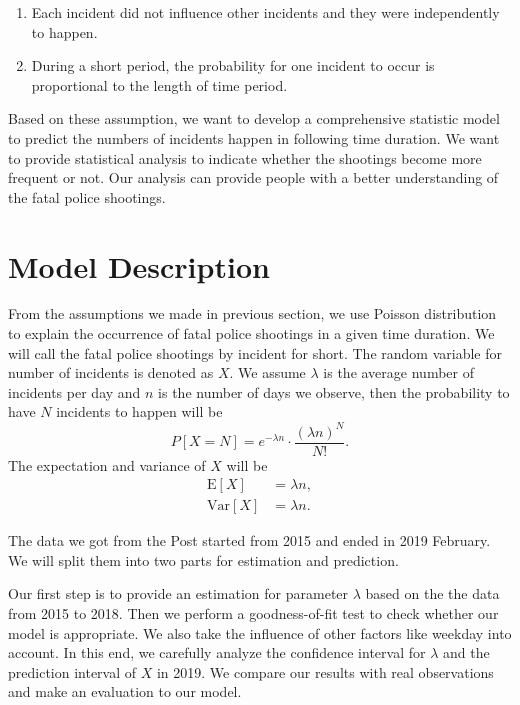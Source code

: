 \documentclass[11pt,a4paper,english]{article}
\begin{document}
\begin{enumerate}
    \item Each incident did not influence other incidents and they were independently to happen.
    \item During a short period, the probability for one incident to occur is proportional to the length of time period. 
\end{enumerate}
Based on these assumption, we want to develop a comprehensive statistic model to predict the numbers of incidents happen in following time duration. We want to provide statistical analysis to indicate whether the shootings become more frequent or not. Our analysis can provide people with a better understanding of the fatal police shootings.
\section{Model Description}
From the assumptions we made in previous section, we use Poisson distribution to explain the occurrence of fatal police shootings in a given time duration. 
We will call the fatal police shootings by incident for short. 
The random variable for number of incidents is denoted as $X$. 
We assume $\lambda$ is the average number of incidents per day and $n$ is the number of days we observe, then the probability to have $N$ incidents to happen will be 
\begin{equation*}
	P[X = N] = e^{-\lambda n}\cdot\frac{(\lambda n)^{N}}{N!}.
\end{equation*}
The expectation and variance of $X$ will be
\begin{align*}
	\text{E}[X] &= \lambda n, \\
	\text{Var}[X] &= \lambda n.
\end{align*}

The data we got from the Post started from 2015 and ended in 2019 February. We will split them into two parts for estimation and prediction.

Our first step is to provide an estimation for parameter $\lambda$ based on the the data from 2015 to 2018. 
Then we perform a goodness-of-fit test to check whether our model is appropriate. 
We also take the influence of other factors like weekday into account. 
In this end, we carefully analyze the confidence interval for $\lambda$ and the prediction interval of $X$ in 2019. 
We compare our results with real observations and make an evaluation to our model. 
\end{document}

